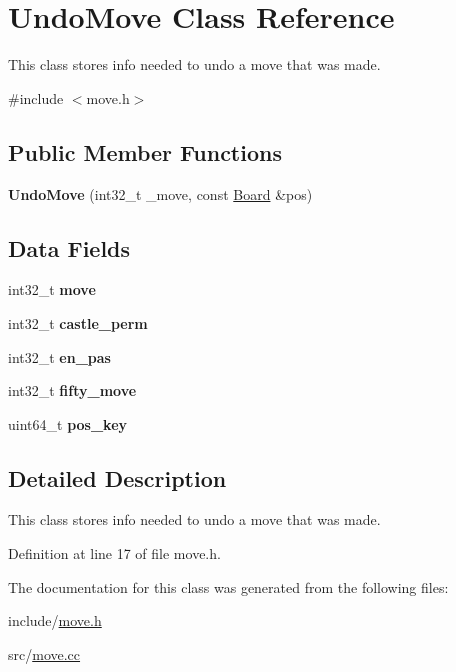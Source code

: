 \hypertarget{classUndoMove}{}\section{Undo\+Move Class Reference}
\label{classUndoMove}


This class stores info needed to undo a move that was made.  




{\ttfamily \#include $<$move.\+h$>$}

\subsection*{Public Member Functions}
\begin{DoxyCompactItemize}
\item 
\mbox{\label{classUndoMove_a3de052beeee8272912fba95e1f097c15}} 
{\bfseries Undo\+Move} (int32\+\_\+t \+\_\+move, const \mbox{\hyperlink{classBoard}{Board}} \&pos)
\end{DoxyCompactItemize}
\subsection*{Data Fields}
\begin{DoxyCompactItemize}
\item 
\mbox{\label{classUndoMove_a829f8e9963dac72b42c166ab62cc9bca}} 
int32\+\_\+t {\bfseries move}
\item 
\mbox{\label{classUndoMove_ae1ea12b372aff6f9636c2c185f7ec1c1}} 
int32\+\_\+t {\bfseries castle\+\_\+perm}
\item 
\mbox{\label{classUndoMove_a801d7c221484ce9e9d70c16c8d0a5749}} 
int32\+\_\+t {\bfseries en\+\_\+pas}
\item 
\mbox{\label{classUndoMove_ac4e428deda8affe8713ab5f9fb0d9d5b}} 
int32\+\_\+t {\bfseries fifty\+\_\+move}
\item 
\mbox{\label{classUndoMove_ae03b245ae0d4c790ad8c7077a837ec14}} 
uint64\+\_\+t {\bfseries pos\+\_\+key}
\end{DoxyCompactItemize}


\subsection{Detailed Description}
This class stores info needed to undo a move that was made. 

Definition at line 17 of file move.\+h.



The documentation for this class was generated from the following files\+:\begin{DoxyCompactItemize}
\item 
include/\mbox{\hyperlink{move_8h}{move.\+h}}\item 
src/\mbox{\hyperlink{move_8cc}{move.\+cc}}\end{DoxyCompactItemize}
